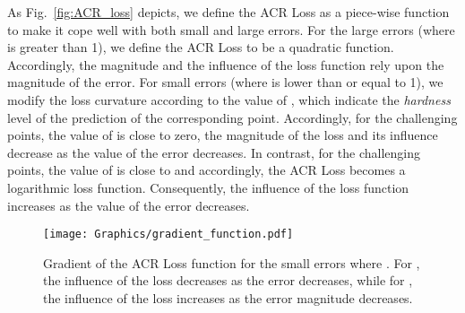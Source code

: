 \documentclass[a4paper,conference]{IEEEtran}
\begin{document}
As Fig.~\ref{fig:ACR_loss} depicts, we define the ACR Loss as a piece-wise function to make it cope well with both small and large errors. For the large errors (where  is greater than 1), we define the ACR Loss to be a quadratic function. Accordingly, the magnitude and the influence of the loss function rely upon the magnitude of the error. For small errors (where  is lower than or equal to 1), we modify the loss curvature according to the value of , which indicate the \textit{hardness} level of the prediction of the corresponding point. Accordingly, for the challenging points, the value of  is close to zero, the magnitude of the loss and its influence decrease as the value of the error decreases. In contrast, for the challenging points, the value of  is close to  and accordingly, the ACR Loss becomes a logarithmic loss function. Consequently, the influence of the loss function increases as the value of the error decreases. 

\begin{figure}[t!]
  \centering
  \texttt{[image: Graphics/gradient\_function.pdf]}
  \caption{Gradient of the ACR Loss function for the small errors where . For  , the influence of the loss decreases as the error decreases, while for , the influence of the loss increases as the error magnitude decreases.}
  \label{fig:gradient_function}
\end{figure}
\newcommand{\STAB}[1]{\begin{tabular}{@{}c@{}}#1\end{tabular}}
\end{document}
